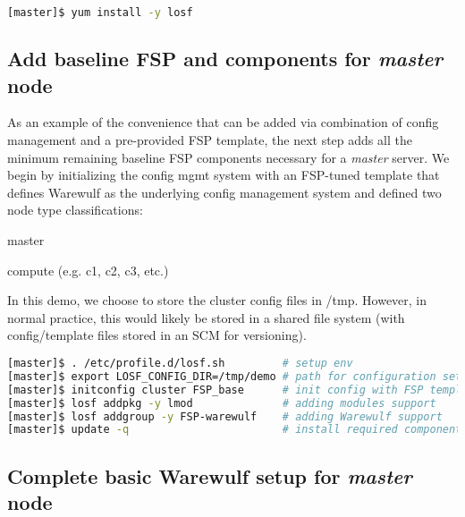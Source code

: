 \documentclass[letterpaper]{article}
\begin{document}

\begin{lstlisting}[language=bash,caption={Commands run on {\bf master node}.}]
[master]$ yum install -y losf
\end{lstlisting}


\subsection{Add baseline FSP and components for {\em master} node}

As an example of the convenience that can be added via combination of config
management and a pre-provided FSP template, the next step adds all the minimum
remaining baseline FSP components necessary for a {\em master} server. We begin
by initializing the config mgmt system with an FSP-tuned template that defines
Warewulf as the underlying config management system and defined two node type
classifications:
\begin{itemize*}
\item master
\item compute (e.g. c1, c2, c3, etc.)
\end{itemize*}
In this demo, we choose to store the cluster config files in /tmp. However, in
normal practice, this would likely be stored in a shared file system (with
config/template files stored in an SCM for versioning).


\begin{lstlisting}[language=bash,keywords={}]
[master]$ . /etc/profile.d/losf.sh         # setup env
[master]$ export LOSF_CONFIG_DIR=/tmp/demo # path for configuration setup
[master]$ initconfig cluster FSP_base      # init config with FSP template
[master]$ losf addpkg -y lmod              # adding modules support
[master]$ losf addgroup -y FSP-warewulf    # adding Warewulf support
[master]$ update -q                        # install required components
\end{lstlisting}


\subsection{Complete basic Warewulf setup for {\em master} node}
\end{document}
